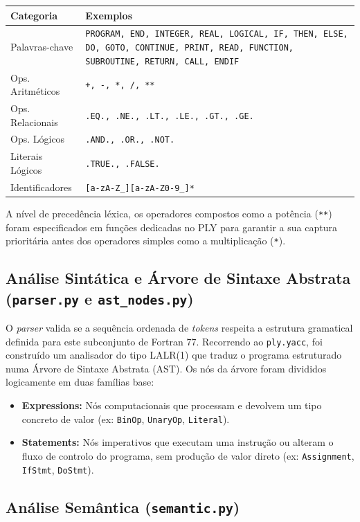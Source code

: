 \documentclass[12pt, a4paper]{article}
\begin{document}
\begin{table}[h!]
\centering
\begin{tabular}{@{}lp{10cm}@{}}
\toprule
\textbf{Categoria} & \textbf{Exemplos} \\ \midrule
Palavras-chave & \texttt{PROGRAM, END, INTEGER, REAL, LOGICAL, IF, THEN, ELSE, DO, GOTO, CONTINUE, PRINT, READ, FUNCTION, SUBROUTINE, RETURN, CALL, ENDIF} \\
Ops. Aritméticos & \texttt{+, -, *, /, **} \\
Ops. Relacionais & \texttt{.EQ., .NE., .LT., .LE., .GT., .GE.} \\
Ops. Lógicos & \texttt{.AND., .OR., .NOT.} \\
Literais Lógicos & \texttt{.TRUE., .FALSE.} \\
Identificadores & \texttt{[a-zA-Z\_][a-zA-Z0-9\_]*} \\ \bottomrule
\end{tabular}
\end{table}

A nível de precedência léxica, os operadores compostos como a potência (\texttt{**}) foram especificados em funções dedicadas no PLY para garantir a sua captura prioritária antes dos operadores simples como a multiplicação (\texttt{*}).

\subsection{Análise Sintática e Árvore de Sintaxe Abstrata (\texttt{parser.py} e \texttt{ast\_nodes.py})}
O \textit{parser} valida se a sequência ordenada de \textit{tokens} respeita a estrutura gramatical definida para este subconjunto de Fortran 77. Recorrendo ao \texttt{ply.yacc}, foi construído um analisador do tipo LALR(1) que traduz o programa estruturado numa Árvore de Sintaxe Abstrata (AST). Os nós da árvore foram divididos logicamente em duas famílias base:
\begin{itemize}
    \item \textbf{Expressions:} Nós computacionais que processam e devolvem um tipo concreto de valor (ex: \texttt{BinOp}, \texttt{UnaryOp}, \texttt{Literal}).
    \item \textbf{Statements:} Nós imperativos que executam uma instrução ou alteram o fluxo de controlo do programa, sem produção de valor direto (ex: \texttt{Assignment}, \texttt{IfStmt}, \texttt{DoStmt}).
\end{itemize}


\subsection{Análise Semântica (\texttt{semantic.py})}
\end{document}
